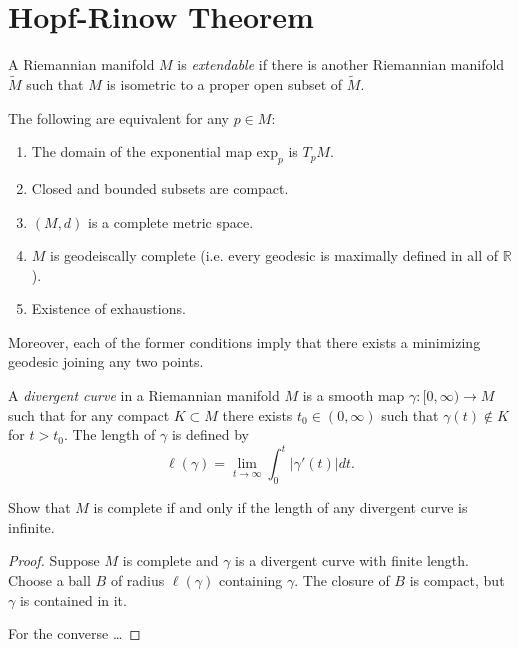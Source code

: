 \documentclass{book}
\begin{document}
\section{Hopf-Rinow Theorem}
\label{section-Hopf-Rinow-theorem}

\begin{definition}
\label{definition-non-extendable}
A Riemannian manifold $M$ is {\it extendable}
if there is another Riemannian manifold
$\tilde{M}$
such that $M$ is isometric to a proper open
subset of $\tilde{M}$.
\end{definition}

\begin{theorem}
\label{theorem-Hopf-Rinow}
The following are equivalent for any $p \in
M$:
\begin{enumerate}
\item The domain of the exponential map
$\text{exp}_p$ is $T_pM$.
\item Closed and bounded subsets are compact.
\item $(M,d)$ is a complete metric space.
\item $M$ is geodeiscally complete (i.e.
every geodesic is maximally defined in
all of $\mathbb{R}$).
\item Existence of exhaustions.
\end{enumerate}
Moreover, each of the former conditions imply
that there exists a minimizing
geodesic joining any two points.
\end{theorem}

\begin{exercise}
\label{exercise-divergent-curves}
\begin{reference}
\cite[Exercise 3.5, Chapter VII]{doc}
\end{reference}
A {\it divergent curve} in a Riemannian
manifold $M$
is a smooth map $\gamma:[0,\infty) \to M$
such that for any compact $K \subset M$
there exists $t_0\in(0,\infty)$
such that $\gamma(t) \not\in K$ for $t>t_0$.
The length of $\gamma$ is defined by
$$
\ell(\gamma)=\lim_{t \to \infty}
\int_0^t|\gamma'(t)|dt.
$$

Show that $M$ is complete if and only if
the length of any divergent curve is
infinite.
\end{exercise}

\begin{proof}
Suppose $M$ is complete and $\gamma$ is a
divergent curve
with finite length. Choose a ball $B$ of
radius $\ell(\gamma)$
containing $\gamma$. The closure of $B$ is
compact,
but $\gamma$ is contained in it.

For the converse …
\end{proof}
\end{document}
